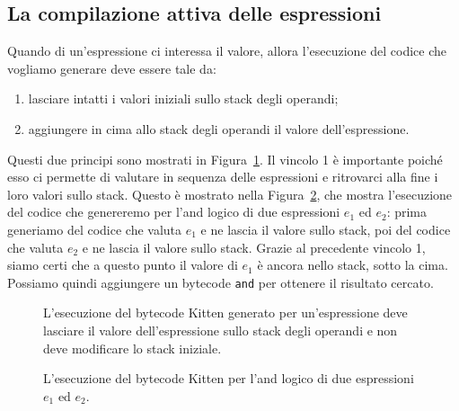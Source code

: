 \subsection{La compilazione attiva delle espressioni}
  \label{subsec:active_compilation}
%
Quando di un'espressione ci interessa il valore, allora l'esecuzione
del codice che vogliamo generare deve essere tale da:
%
\begin{enumerate}
\item lasciare intatti i valori iniziali sullo stack degli operandi;
\item aggiungere in cima allo stack degli operandi il valore dell'espressione.
\end{enumerate}
%
Questi due principi sono mostrati in Figura~\ref{fig:russian}. Il
vincolo 1 \`e importante poich\'e esso ci permette di valutare
in sequenza delle espressioni e ritrovarci alla fine i loro
valori sullo stack.
Questo \`e mostrato nella Figura~\ref{fig:russian_relevance},
che mostra l'esecuzione del codice che genereremo per l'and logico
di due espressioni $e_1$ ed $e_2$: prima generiamo del codice che
valuta $e_1$ e ne lascia il valore sullo stack, poi del codice che
valuta $e_2$ e ne lascia il valore sullo stack. Grazie al precedente vincolo
1, siamo certi che a questo punto il valore di $e_1$ \`e ancora nello stack,
sotto la cima. Possiamo quindi aggiungere un bytecode \texttt{and} per
ottenere il risultato cercato.

\begin{figure}[t]
\begin{center}
\end{center}
\caption{L'esecuzione del bytecode Kitten generato per un'espressione deve lasciare il valore dell'espressione sullo stack degli operandi e non deve modificare lo stack iniziale.}
  \label{fig:russian}
\end{figure}
%
\begin{figure}[t]
\begin{center}
\end{center}
\caption{L'esecuzione del bytecode Kitten per l'and logico di due espressioni $e_1$ ed $e_2$.}
  \label{fig:russian_relevance}
\end{figure}


